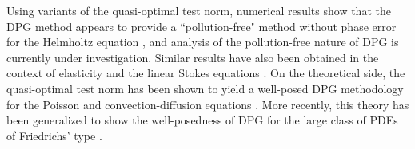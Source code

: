 %


Using variants of the quasi-optimal test norm, numerical results show that the DPG method appears to provide a ``pollution-free" method without phase error for the Helmholtz equation \cite{DPG4}, and analysis of the pollution-free nature of DPG is currently under investigation. Similar results have also been obtained in the context of elasticity \cite{DPGElas} and the linear Stokes equations \cite{Camellia}. On the theoretical side, the quasi-optimal test norm has been shown to yield a well-posed DPG methodology for the Poisson and convection-diffusion equations \cite{analysisDPG}. More recently, this theory has been generalized to show the well-posedness of DPG for the large class of PDEs of Friedrichs' type \cite{Bui-ThanhDemkowiczGhattas11b}.  

